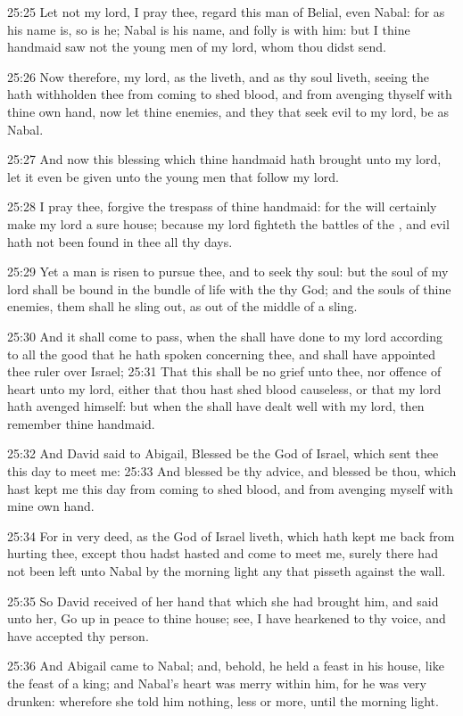 25:25 Let not my lord, I pray thee, regard this man of Belial, even Nabal: for as his name is, so is he; Nabal is his name, and folly is with him: but I thine handmaid saw not the young men of my lord, whom thou didst send.

25:26 Now therefore, my lord, as the \LORD liveth, and as thy soul liveth, seeing the \LORD hath withholden thee from coming to shed blood, and from avenging thyself with thine own hand, now let thine enemies, and they that seek evil to my lord, be as Nabal.

25:27 And now this blessing which thine handmaid hath brought unto my lord, let it even be given unto the young men that follow my lord.

25:28 I pray thee, forgive the trespass of thine handmaid: for the \LORD will certainly make my lord a sure house; because my lord fighteth the battles of the \LORD, and evil hath not been found in thee all thy days.

25:29 Yet a man is risen to pursue thee, and to seek thy soul: but the soul of my lord shall be bound in the bundle of life with the \LORD thy God; and the souls of thine enemies, them shall he sling out, as out of the middle of a sling.

25:30 And it shall come to pass, when the \LORD shall have done to my lord according to all the good that he hath spoken concerning thee, and shall have appointed thee ruler over Israel; 25:31 That this shall be no grief unto thee, nor offence of heart unto my lord, either that thou hast shed blood causeless, or that my lord hath avenged himself: but when the \LORD shall have dealt well with my lord, then remember thine handmaid.

25:32 And David said to Abigail, Blessed be the \LORD God of Israel, which sent thee this day to meet me: 25:33 And blessed be thy advice, and blessed be thou, which hast kept me this day from coming to shed blood, and from avenging myself with mine own hand.

25:34 For in very deed, as the \LORD God of Israel liveth, which hath kept me back from hurting thee, except thou hadst hasted and come to meet me, surely there had not been left unto Nabal by the morning light any that pisseth against the wall.

25:35 So David received of her hand that which she had brought him, and said unto her, Go up in peace to thine house; see, I have hearkened to thy voice, and have accepted thy person.

25:36 And Abigail came to Nabal; and, behold, he held a feast in his house, like the feast of a king; and Nabal's heart was merry within him, for he was very drunken: wherefore she told him nothing, less or more, until the morning light.

